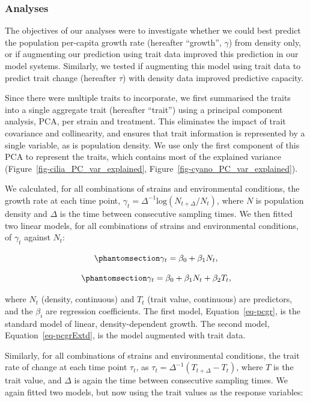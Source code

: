 \documentclass[
  letterpaper,
  DIV=11,
  numbers=noendperiod]{scrartcl}
\begin{document}
\subsubsection{Analyses}\label{analyses}

The objectives of our analyses were to investigate whether we could best
predict the population per-capita growth rate (hereafter ``growth'',
\(\gamma\)) from density only, or if augmenting our prediction using
trait data improved this prediction in our model systems. Similarly, we
tested if augmenting this model using trait data to predict trait change
(hereafter \(\tau\)) with density data improved predictive capacity.

Since there were multiple traits to incorporate, we first summarised the
traits into a single aggregate trait (hereafter ``trait'') using a
principal component analysis, PCA, per strain and treatment. This
eliminates the impact of trait covariance and collinearity, and ensures
that trait information is represented by a single variable, as is
population density. We use only the first component of this PCA to
represent the traits, which contains most of the explained variance
(Figure~\ref{fig-cilia_PC_var_explained},
Figure~\ref{fig-cyano_PC_var_explained}).

We calculated, for all combinations of strains and environmental
conditions, the growth rate at each time point,
\(\gamma_t=\Delta^{-1}\textrm{log}(N_{t+\Delta}/N_t)\), where \(N\) is
population density and \(\Delta\) is the time between consecutive
sampling times. We then fitted two linear models, for all combinations
of strains and environmental conditions, of \(\gamma_t\) against
\(N_t\):

\begin{equation}\phantomsection\label{eq-pcgr}{
\gamma_t = \beta_0 + \beta_1 N_t,
}\end{equation}

\begin{equation}\phantomsection\label{eq-pcgrExtd}{
\gamma_t = \beta_0 + \beta_1 N_t + \beta_2 T_t,
}\end{equation}

where \(N_t\) (density, continuous) and \(T_t\) (trait value,
continuous) are predictors, and the \(\beta_i\) are regression
coefficients. The first model, Equation~\ref{eq-pcgr}, is the standard
model of linear, density-dependent growth. The second model,
Equation~\ref{eq-pcgrExtd}, is the model augmented with trait data.

Similarly, for all combinations of strains and environmental conditions,
the trait rate of change at each time point \(\tau_t\), as
\(\tau_t=\Delta^{-1}(T_{t+\Delta}-T_{t})\), where \(T\) is the trait
value, and \(\Delta\) is again the time between consecutive sampling
times. We again fitted two models, but now using the trait values as the
response variables:
\end{document}
